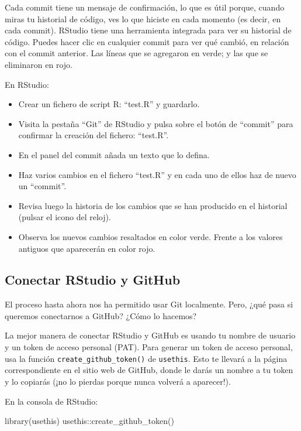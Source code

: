 \documentclass[
  letterpaper,
  DIV=11,
  numbers=noendperiod]{scrreprt}
\newenvironment{Shaded}{\begin{snugshade}}{\end{snugshade}}
\newcommand{\FunctionTok}[1]{\textcolor[rgb]{0.28,0.35,0.67}{#1}}
\newcommand{\NormalTok}[1]{\textcolor[rgb]{0.00,0.23,0.31}{#1}}
\newcommand{\SpecialCharTok}[1]{\textcolor[rgb]{0.37,0.37,0.37}{#1}}
\begin{document}
Cada commit tiene un mensaje de confirmación, lo que es útil porque,
cuando miras tu historial de código, ves lo que hiciste en cada momento
(es decir, en cada commit). RStudio tiene una herramienta integrada para
ver su historial de código. Puedes hacer clic en cualquier commit para
ver qué cambió, en relación con el commit anterior. Las líneas que se
agregaron en verde; y las que se eliminaron en rojo.

En RStudio:

\begin{itemize}
\item
  Crear un fichero de script R: ``test.R'' y guardarlo.
\item
  Visita la pestaña ``Git'' de RStudio y pulsa sobre el botón de
  ``commit'' para confirmar la creación del fichero: ``test.R''.
\item
  En el panel del commit añada un texto que lo defina.
\item
  Haz varios cambios en el fichero ``test.R'' y en cada uno de ellos haz
  de nuevo un ``commit''.
\item
  Revisa luego la historia de los cambios que se han producido en el
  historial (pulsar el icono del reloj).
\item
  Observa los nuevos cambios resaltados en color verde. Frente a los
  valores antiguos que aparecerán en color rojo.
\end{itemize}

\subsection{Conectar RStudio y GitHub}\label{conectar-rstudio-y-github}

El proceso hasta ahora nos ha permitido usar Git localmente. Pero, ¿qué
pasa si queremos conectarnos a GitHub? ¿Cómo lo hacemos?

La mejor manera de conectar RStudio y GitHub es usando tu nombre de
usuario y un token de acceso personal (PAT). Para generar un token de
acceso personal, usa la función \texttt{create\_github\_token()} de
\texttt{usethis}. Esto te llevará a la página correspondiente en el
sitio web de GitHub, donde le darás un nombre a tu token y lo copiarás
(¡no lo pierdas porque nunca volverá a aparecer!).

En la consola de RStudio:

\begin{Shaded}
\begin{Highlighting}[]
\FunctionTok{library}\NormalTok{(usethis)}
\NormalTok{usethis}\SpecialCharTok{::}\FunctionTok{create\_github\_token}\NormalTok{()}
\end{Highlighting}
\end{Shaded}
\end{document}
